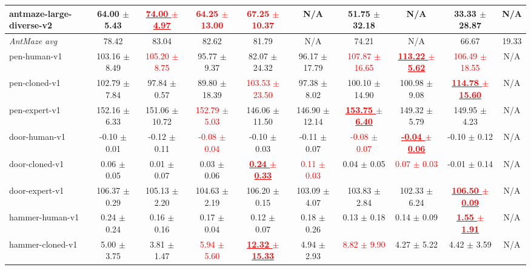 \documentclass[a4paper]{article}
\begin{document}
\begin{table}[t]
{\begin{tabular}{lccccccccc}
    antmaze-large-diverse-v2 & 64.00 $\pm$ 5.43 & \textcolor{red}{\textbf{\underline{74.00 $\pm$ 4.97}}} & \textcolor{red}{64.25 $\pm$ 13.00} & \textcolor{red}{67.25 $\pm$ 10.37} & N/A & 51.75 $\pm$ 32.18 & N/A & 33.33 $\pm$ 28.87 & N/A \\
    \midrule
    \textit{AntMaze avg} & 78.42 & 83.04 & 82.62 & 81.79 & N/A & 74.21 & N/A & 66.67 & 19.33 \\
    \midrule
    pen-human-v1 & 103.16 $\pm$ 8.49 & \textcolor{red}{105.20 $\pm$ 8.75} & 95.77 $\pm$ 9.37 & 82.07 $\pm$ 24.32 & 96.17 $\pm$ 17.79 & \textcolor{red}{107.87 $\pm$ 16.65} & \textcolor{red}{\textbf{\underline{113.22 $\pm$ 5.62}}} & \textcolor{red}{106.49 $\pm$ 18.55} & N/A \\
    pen-cloned-v1 & 102.79 $\pm$ 7.84 & 97.84 $\pm$ 0.57 & 89.80 $\pm$ 18.39 & \textcolor{red}{103.53 $\pm$ 23.50} & 97.38 $\pm$ 8.02 & 100.10 $\pm$ 14.90 & 100.98 $\pm$ 9.08 & \textcolor{red}{\textbf{\underline{114.78 $\pm$ 15.60}}} & N/A \\
    pen-expert-v1 & 152.16 $\pm$ 6.33 & 151.06 $\pm$ 10.72 & \textcolor{red}{152.79 $\pm$ 5.03} & 146.06 $\pm$ 11.50 & 146.90 $\pm$ 12.14 & \textcolor{red}{\textbf{\underline{153.75 $\pm$ 6.40}}} & 149.32 $\pm$ 5.79 & 149.95 $\pm$ 4.23 & N/A \\
    door-human-v1 & -0.10 $\pm$ 0.01 & -0.12 $\pm$ 0.11 & \textcolor{red}{-0.08 $\pm$ 0.04} & -0.10 $\pm$ 0.03 & -0.11 $\pm$ 0.07 & \textcolor{red}{-0.08 $\pm$ 0.07} & \textcolor{red}{\textbf{\underline{-0.04 $\pm$ 0.06}}} & -0.10 $\pm$ 0.12 & N/A \\
    door-cloned-v1 & 0.06 $\pm$ 0.05 & 0.01 $\pm$ 0.07 & 0.03 $\pm$ 0.06 & \textcolor{red}{\textbf{\underline{0.24 $\pm$ 0.33}}} & \textcolor{red}{0.11 $\pm$ 0.03} & 0.04 $\pm$ 0.05 & \textcolor{red}{0.07 $\pm$ 0.03} & -0.01 $\pm$ 0.14 & N/A \\
    door-expert-v1 & 106.37 $\pm$ 0.29 & 105.13 $\pm$ 2.20 & 104.63 $\pm$ 2.19 & 106.20 $\pm$ 0.15 & 103.09 $\pm$ 4.07 & 103.83 $\pm$ 2.84 & 102.33 $\pm$ 6.24 & \textcolor{red}{\textbf{\underline{106.50 $\pm$ 0.09}}} & N/A \\
    hammer-human-v1 & 0.24 $\pm$ 0.24 & 0.16 $\pm$ 0.16 & 0.17 $\pm$ 0.04 & 0.12 $\pm$ 0.07 & 0.18 $\pm$ 0.26 & 0.13 $\pm$ 0.18 & 0.14 $\pm$ 0.09 & \textcolor{red}{\textbf{\underline{1.55 $\pm$ 1.91}}} & N/A \\
    hammer-cloned-v1 & 5.00 $\pm$ 3.75 & 3.81 $\pm$ 1.47 & \textcolor{red}{5.94 $\pm$ 5.60} & \textcolor{red}{\textbf{\underline{12.32 $\pm$ 15.33}}} & 4.94 $\pm$ 2.93 & \textcolor{red}{8.82 $\pm$ 9.90} & 4.27 $\pm$ 5.22 & 4.42 $\pm$ 3.59 & N/A \\

\end{tabular}}
\end{table}
\end{document}
